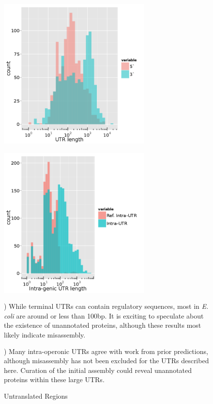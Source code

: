\begin{figure}
\small
\begin{center}
\begin{minipage}{.5\textwidth}
\begin{center}
{\includegraphics[width=\linewidth,height=3in]{images/Assembly/Summary/putrlength.png}
\label{fig:5.4a}}
\end{center}
\end{minipage}%
\begin{minipage}{.5\textwidth}
\begin{center}
{\includegraphics[width=\linewidth,height=3in]{images/Assembly/Summary/pintrautrlength_1.png}
\label{fig:5.4b}}
\end{center}
\end{minipage}
\end{center}
\caption{Untranslated Regions}
) While terminal UTRs can contain regulatory sequences, most in \textit{E. coli}\cite{87} are around or less than 100bp. It is exciting to speculate about the existence of unannotated proteins, although these results most likely indicate misassembly.

) Many intra-operonic UTRs agree with work from prior predictions\cite{188}, although misassembly has not been excluded for the UTRs described here. Curation of the initial assembly could reveal unannotated proteins within these large UTRs.
\end{figure}

